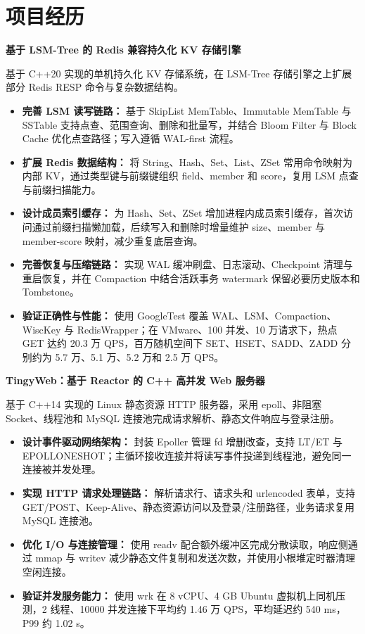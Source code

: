 \documentclass{resume}
\begin{document}
\section{项目经历}
\noindent\textbf{基于 LSM-Tree 的 Redis 兼容持久化 KV 存储引擎}\par
\vspace{0.15ex}
基于 C++20 实现的单机持久化 KV 存储系统，在 LSM-Tree 存储引擎之上扩展部分 Redis RESP 命令与复杂数据结构。\par
\begin{itemize}[parsep=0.05ex]
  \item \textbf{完善 LSM 读写链路：} 基于 SkipList MemTable、Immutable MemTable 与 SSTable 支持点查、范围查询、删除和批量写，并结合 Bloom Filter 与 Block Cache 优化点查路径；写入遵循 WAL-first 流程。
  \item \textbf{扩展 Redis 数据结构：} 将 String、Hash、Set、List、ZSet 常用命令映射为内部 KV，通过类型键与前缀键组织 field、member 和 score，复用 LSM 点查与前缀扫描能力。
  \item \textbf{设计成员索引缓存：} 为 Hash、Set、ZSet 增加进程内成员索引缓存，首次访问通过前缀扫描懒加载，后续写入和删除时增量维护 size、member 与 member-score 映射，减少重复底层查询。
  \item \textbf{完善恢复与压缩链路：} 实现 WAL 缓冲刷盘、日志滚动、Checkpoint 清理与重启恢复，并在 Compaction 中结合活跃事务 watermark 保留必要历史版本和 Tombstone。
  \item \textbf{验证正确性与性能：} 使用 GoogleTest 覆盖 WAL、LSM、Compaction、WiscKey 与 RedisWrapper；在 VMware、100 并发、10 万请求下，热点 GET 达约 20.3 万 QPS，百万随机空间下 SET、HSET、SADD、ZADD 分别约为 5.7 万、5.1 万、5.2 万和 2.5 万 QPS。
\end{itemize}

\noindent\textbf{TingyWeb：基于 Reactor 的 C++ 高并发 Web 服务器}\par
\vspace{0.15ex}
基于 C++14 实现的 Linux 静态资源 HTTP 服务器，采用 epoll、非阻塞 Socket、线程池和 MySQL 连接池完成请求解析、静态文件响应与登录注册。\par
\begin{itemize}[parsep=0.05ex]
  \item \textbf{设计事件驱动网络架构：} 封装 Epoller 管理 fd 增删改查，支持 LT/ET 与 EPOLLONESHOT；主循环接收连接并将读写事件投递到线程池，避免同一连接被并发处理。
  \item \textbf{实现 HTTP 请求处理链路：} 解析请求行、请求头和 urlencoded 表单，支持 GET/POST、Keep-Alive、静态资源访问以及登录/注册路径，业务请求复用 MySQL 连接池。
  \item \textbf{优化 I/O 与连接管理：} 使用 readv 配合额外缓冲区完成分散读取，响应侧通过 mmap 与 writev 减少静态文件复制和发送次数，并使用小根堆定时器清理空闲连接。
  \item \textbf{验证并发服务能力：} 使用 wrk 在 8 vCPU、4 GB Ubuntu 虚拟机上同机压测，2 线程、10000 并发连接下平均约 1.46 万 QPS，平均延迟约 540 ms，P99 约 1.02 s。
\end{itemize}
\end{document}
